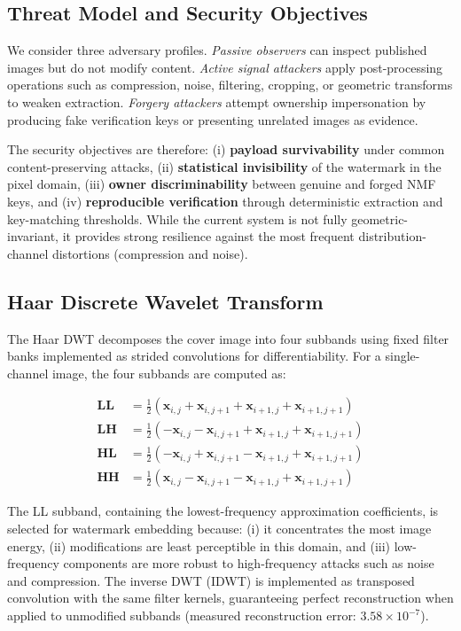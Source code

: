 \documentclass[journal]{IEEEtran}
\begin{document}
\subsection{Threat Model and Security Objectives}

We consider three adversary profiles. \textit{Passive observers} can inspect
published images but do not modify content. \textit{Active signal attackers}
apply post-processing operations such as compression, noise, filtering,
cropping, or geometric transforms to weaken extraction. \textit{Forgery
attackers} attempt ownership impersonation by producing fake verification keys
or presenting unrelated images as evidence.

The security objectives are therefore: (i) \textbf{payload survivability} under
common content-preserving attacks, (ii) \textbf{statistical invisibility} of the
watermark in the pixel domain, (iii) \textbf{owner discriminability} between
genuine and forged NMF keys, and (iv) \textbf{reproducible verification}
through deterministic extraction and key-matching thresholds. While the current
system is not fully geometric-invariant, it provides strong resilience against
the most frequent distribution-channel distortions (compression and noise).

\subsection{Haar Discrete Wavelet Transform}

The Haar DWT decomposes the cover image into four subbands using fixed
filter banks implemented as strided convolutions for differentiability.
For a single-channel image, the four subbands are computed as:

\begin{align}
  \mathbf{LL} &= \frac{1}{2}(\mathbf{x}_{i,j} + \mathbf{x}_{i,j+1}
    + \mathbf{x}_{i+1,j} + \mathbf{x}_{i+1,j+1}) \label{eq:ll}\\
  \mathbf{LH} &= \frac{1}{2}(-\mathbf{x}_{i,j} - \mathbf{x}_{i,j+1}
    + \mathbf{x}_{i+1,j} + \mathbf{x}_{i+1,j+1}) \label{eq:lh}\\
  \mathbf{HL} &= \frac{1}{2}(-\mathbf{x}_{i,j} + \mathbf{x}_{i,j+1}
    - \mathbf{x}_{i+1,j} + \mathbf{x}_{i+1,j+1}) \label{eq:hl}\\
  \mathbf{HH} &= \frac{1}{2}(\mathbf{x}_{i,j} - \mathbf{x}_{i,j+1}
    - \mathbf{x}_{i+1,j} + \mathbf{x}_{i+1,j+1}) \label{eq:hh}
\end{align}

The LL subband, containing the lowest-frequency approximation
coefficients, is selected for watermark embedding because: (i) it
concentrates the most image energy, (ii) modifications are least
perceptible in this domain, and (iii) low-frequency components are
more robust to high-frequency attacks such as noise and compression.
The inverse DWT (IDWT) is implemented as transposed convolution with
the same filter kernels, guaranteeing perfect reconstruction when
applied to unmodified subbands (measured reconstruction error:
$3.58 \times 10^{-7}$).
\end{document}
